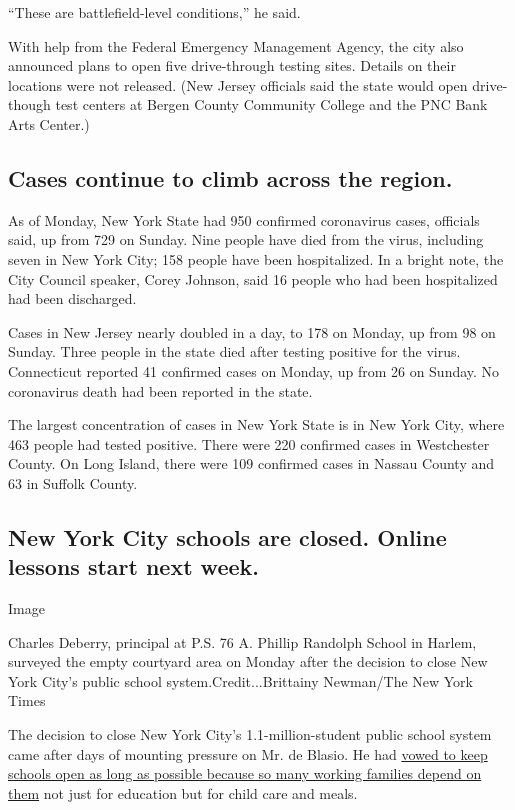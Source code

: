 ``These are battlefield-level conditions,'' he said.

With help from the Federal Emergency Management Agency, the city also
announced plans to open five drive-through testing sites. Details on
their locations were not released. (New Jersey officials said the state
would open drive-though test centers at Bergen County Community College
and the PNC Bank Arts Center.)

\hypertarget{cases-continue-to-climb-across-the-region}{%
\subsection{Cases continue to climb across the
region.}\label{cases-continue-to-climb-across-the-region}}

As of Monday, New York State had 950 confirmed coronavirus cases,
officials said, up from 729 on Sunday. Nine people have died from the
virus, including seven in New York City; 158 people have been
hospitalized. In a bright note, the City Council speaker, Corey Johnson,
said 16 people who had been hospitalized had been discharged.

Cases in New Jersey nearly doubled in a day, to 178 on Monday, up from
98 on Sunday. Three people in the state died after testing positive for
the virus. Connecticut reported 41 confirmed cases on Monday, up from 26
on Sunday. No coronavirus death had been reported in the state.

The largest concentration of cases in New York State is in New York
City, where 463 people had tested positive. There were 220 confirmed
cases in Westchester County. On Long Island, there were 109 confirmed
cases in Nassau County and 63 in Suffolk County.

\hypertarget{new-york-city-schools-are-closed-online-lessons-start-next-week}{%
\subsection{New York City schools are closed. Online lessons start next
week.}\label{new-york-city-schools-are-closed-online-lessons-start-next-week}}

Image

Charles Deberry, principal at P.S. 76 A. Phillip Randolph School in
Harlem, surveyed the empty courtyard area on Monday after the decision
to close New York City's public school system.Credit...Brittainy
Newman/The New York Times

The decision to close New York City's 1.1-million-student public school
system came after days of mounting pressure on Mr. de Blasio. He had
\href{https://www.nytimes3xbfgragh.onion/2020/03/16/nyregion/nyc-schools-closed-coronavirus.html}{vowed
to keep schools open as long as possible because so many working
families depend on them} not just for education but for child care and
meals.

